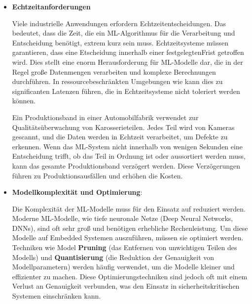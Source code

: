 \begin{itemize}
    \item \textbf{Echtzeitanforderungen}

    Viele industrielle Anwendungen erfordern Echtzeitentscheidungen. Das bedeutet, dass die Zeit, die ein ML-Algorithmus für die 
    Verarbeitung und Entscheidung benötigt, extrem kurz sein muss. Echtzeitsysteme müssen garantieren, dass eine Etscheidung innerhalb 
    einer festgelegtenFrist getroffen wird. Dies stellt eine enorm Herausforderung für ML-Modelle dar, die in der Regel große Datenmengen
    verarbeiten und komplexe Berechnungen durchführen. In ressourcebeschränkten Umgebungen wie \Emb kann dies zu significanten Latenzen 
    führen, die in Echtzeitsysteme nicht toleriert werden können.

    \begin{tcolorbox}[colback=myblue1, colframe=myblue3, coltitle=myblue5, title=Beispiel]
        Ein Produktionsband in einer Automobilfabrik verwendet \ML zur Qualitätsüberwachung von Karosserieteilen. 
        Jedes Teil wird von Kameras gescannt, und die Daten werden in Echtzeit verarbeitet, um Defekte zu erkennen. Wenn das ML-System 
        nicht innerhalb von wenigen Sekunden eine Entscheidung trifft, ob das Teil in Ordnung ist oder aussortiert werden muss, 
        kann das gesamte Produktionsband verzögert werden. Diese Verzögerungen führen zu Produktionsausfällen und erhöhen die Kosten.
        
    \end{tcolorbox}
\end{itemize}

\begin{itemize}
    \item \textbf{Modellkomplexität und Optimierung}:

    Die Komplexität der ML-Modelle muss für den Einsatz auf \Emb reduziert werden. Moderne ML-Modelle, wie tiefe neuronale 
    Netze (Deep Neural Networks, DNNs), sind oft sehr groß und benötigen erhebliche Rechenleistung. Um diese Modelle auf Embedded 
    Systemen auszuführen, müssen sie optimiert werden. Techniken wie Model \textbf{Pruning} (das Entfernen von unwichtigen Teilen des Modells) 
    und \textbf{Quantisierung} (die Reduktion der Genauigkeit von Modellparametern) \cite{articleQuantization} werden häufig verwendet, um die Modelle kleiner und effizienter 
    zu machen. Diese Optimierungstechniken sind jedoch oft mit einem Verlust an Genauigkeit verbunden, was den Einsatz in sicherheitskritischen 
    Systemen einschränken kann.
\end{itemize}

